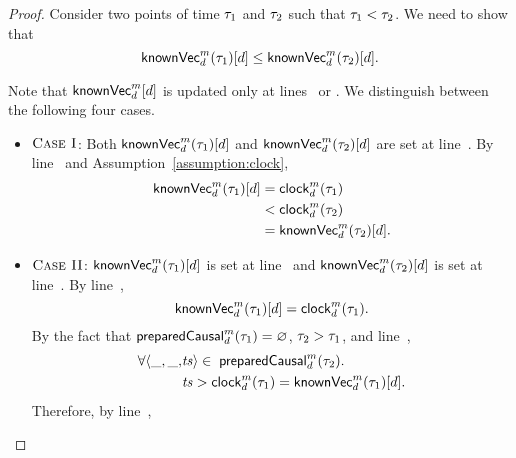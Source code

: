 \begin{proof} \label{proof:knownvc-d-nondecreasing}
  Consider two points of time $\tau_{1}$ and $\tau_{2}$ such that $\tau_{1} < \tau_{2}$.
  We need to show that
  \[
    {\sf knownVec}^{m}_{d}(\tau_{1})[d] \le {\sf knownVec}^{m}_{d}(\tau_{2})[d].
  \]

  Note that ${\sf knownVec}^{m}_{d}[d]$ is updated only
  at lines~\code{\ref{alg:unistore-replication}}{\ref{line:propagate-knownvc-clock}}
  or \code{\ref{alg:unistore-replication}}{\ref{line:propagate-knownvc-ts}}.
  We distinguish between the following four cases.
  \begin{itemize}
    \item $\textsc{Case I}$:
      Both ${\sf knownVec}^{m}_{d}(\tau_{1})[d]$ and ${\sf knownVec}^{m}_{d}(\tau_{2})[d]$ are set
      at line~\code{\ref{alg:unistore-replication}}{\ref{line:propagate-knownvc-clock}}.
      By line~\code{\ref{alg:unistore-replication}}{\ref{line:propagate-knownvc-clock}}
      and Assumption~\ref{assumption:clock},
      \begin{align*}
        {\sf knownVec}^{m}_{d}(\tau_{1})[d] &= {\sf clock}^{m}_{d}(\tau_{1}) \\
          &< {\sf clock}^{m}_{d}(\tau_{2}) \\
          &= {\sf knownVec}^{m}_{d}(\tau_{2})[d].
      \end{align*}
    \item $\textsc{Case II}$:
      ${\sf knownVec}^{m}_{d}(\tau_{1})[d]$ is set
      at line~\code{\ref{alg:unistore-replication}}{\ref{line:propagate-knownvc-clock}}
      and ${\sf knownVec}^{m}_{d}(\tau_{2})[d]$ is set
      at line~\code{\ref{alg:unistore-replication}}{\ref{line:propagate-knownvc-ts}}.
      By line~\code{\ref{alg:unistore-replication}}{\ref{line:propagate-knownvc-clock}},
      \[
        {\sf knownVec}^{m}_{d}(\tau_{1})[d] = {\sf clock}^{m}_{d}(\tau_{1}).
      \]
      By the fact that ${\sf preparedCausal}^{m}_{d}(\tau_{1}) = \varnothing$,
      $\tau_{2} > \tau_{1}$,
      and line~\code{\ref{alg:unistore-replica}}{\ref{line:preparecausal-ts}},
      \begin{align*}
        \forall \langle \_, \_, &\mathit{ts} \rangle \in\; {\sf preparedCausal}^{m}_{d}(\tau_{2}).\; \\
          &\mathit{ts} > {\sf clock}^{m}_{d}(\tau_{1}) = {\sf knownVec}^{m}_{d}(\tau_{1})[d].
      \end{align*}
      Therefore, by line~\code{\ref{alg:unistore-replication}}{\ref{line:propagate-knownvc-ts}},

\end{itemize}
\end{proof}

